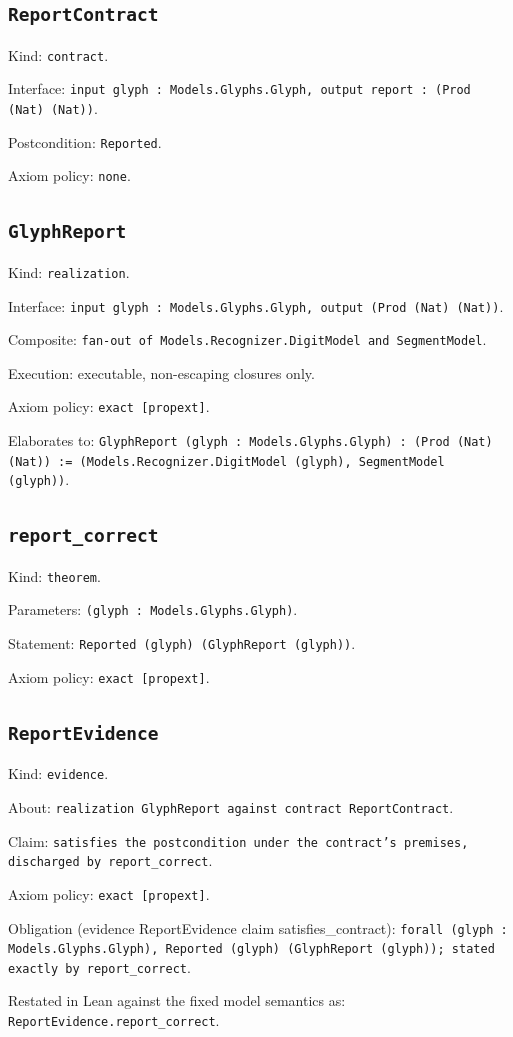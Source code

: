 \documentclass[11pt]{article}
\begin{document}
\subsection*{\texttt{ReportContract}}
\noindent Kind: \texttt{contract}.\par
\noindent Interface: \texttt{input glyph : Models.Glyphs.Glyph, output report : (Prod (Nat) (Nat))}.\par
\noindent Postcondition: \texttt{Reported}.\par
\noindent Axiom policy: \texttt{none}.\par
\subsection*{\texttt{GlyphReport}}
\noindent Kind: \texttt{realization}.\par
\noindent Interface: \texttt{input glyph : Models.Glyphs.Glyph, output (Prod (Nat) (Nat))}.\par
\noindent Composite: \texttt{fan-out of Models.Recognizer.DigitModel and SegmentModel}.\par
\noindent Execution: executable, non-escaping closures only.\par
\noindent Axiom policy: \texttt{exact [propext]}.\par
\noindent Elaborates to: \texttt{GlyphReport (glyph : Models.Glyphs.Glyph) : (Prod (Nat) (Nat)) := (Models.Recognizer.DigitModel (glyph), SegmentModel (glyph))}.\par
\subsection*{\texttt{report\_correct}}
\noindent Kind: \texttt{theorem}.\par
\noindent Parameters: \texttt{(glyph : Models.Glyphs.Glyph)}.\par
\noindent Statement: \texttt{Reported (glyph) (GlyphReport (glyph))}.\par
\noindent Axiom policy: \texttt{exact [propext]}.\par
\subsection*{\texttt{ReportEvidence}}
\noindent Kind: \texttt{evidence}.\par
\noindent About: \texttt{realization GlyphReport against contract ReportContract}.\par
\noindent Claim: \texttt{satisfies the postcondition under the contract's premises, discharged by report\_correct}.\par
\noindent Axiom policy: \texttt{exact [propext]}.\par
\noindent Obligation (evidence ReportEvidence claim satisfies\_contract): \texttt{forall (glyph : Models.Glyphs.Glyph), Reported (glyph) (GlyphReport (glyph)); stated exactly by report\_correct}.\par
\noindent Restated in Lean against the fixed model semantics as: \texttt{ReportEvidence.report\_correct}.\par
\end{document}
